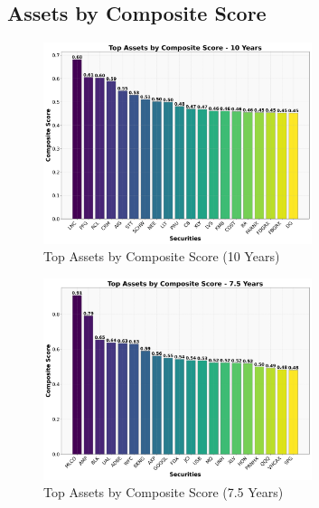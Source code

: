\subsection{Assets by Composite Score}

\begin{figure}[!htbp]
    \centering
    \includegraphics[width=0.7\textwidth]{../Figures/top_assets_composite_score_10_years.png}
    \caption{Top Assets by Composite Score (10 Years)}
    \label{fig:top_assets_10y}
\end{figure}
\FloatBarrier

\begin{figure}[!htbp]
    \centering
    \includegraphics[width=0.7\textwidth]{../Figures/top_assets_composite_score_7_5_years.png}
    \caption{Top Assets by Composite Score (7.5 Years)}
    \label{fig:top_assets_7_5y}
\end{figure}
\FloatBarrier

